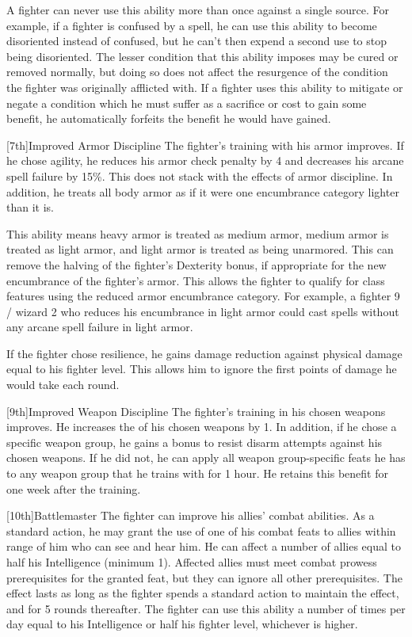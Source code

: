\par A fighter can never use this ability more than once against a single source.
For example, if a fighter is confused by a  spell, he can use this ability to become disoriented instead of confused, but he can't then expend a second use to stop being disoriented.
The lesser condition that this ability imposes may be cured or removed normally, but doing so does not affect the resurgence of the condition the fighter was originally afflicted with.
If a fighter uses this ability to mitigate or negate a condition which he must suffer as a sacrifice or cost to gain some benefit, he automatically forfeits the benefit he would have gained.

[7th]{Improved Armor Discipline}
The fighter's training with his armor improves.
If he chose agility, he reduces his armor check penalty by 4 and decreases his arcane spell failure by 15\%.
This does not stack with the effects of armor discipline.
In addition, he treats all body armor as if it were one encumbrance category lighter than it is.
\par This ability means heavy armor is treated as medium armor, medium armor is treated as light armor, and light armor is treated as being unarmored.
This can remove the halving of the fighter's Dexterity bonus, if appropriate for the new encumbrance of the fighter's armor.
This allows the fighter to qualify for class features using the reduced armor encumbrance category.
For example, a fighter 9 / wizard 2 who reduces his encumbrance in light armor could cast spells without any arcane spell failure in light armor.

If the fighter chose resilience, he gains damage reduction against physical damage equal to his fighter level. This allows him to ignore the first points of damage he would take each round.

[9th]{Improved Weapon Discipline}
The fighter's training in his chosen weapons improves.
He increases the  of his chosen weapons by 1.
In addition, if he chose a specific weapon group, he gains a  bonus to resist disarm attempts against his chosen weapons.
If he did not, he can apply all weapon group-specific feats he has to any weapon group that he trains with for 1 hour.
He retains this benefit for one week after the training.

[10th]{Battlemaster}
The fighter can improve his allies' combat abilities.
As a standard action, he may grant the use of one of his combat feats to allies within \rngmed range of him who can see and hear him.
He can affect a number of allies equal to half his Intelligence (minimum 1).
Affected allies must meet combat prowess prerequisites for the granted feat, but they can ignore all other prerequisites.
The effect lasts as long as the fighter spends a standard action to maintain the effect, and for 5 rounds thereafter.
The fighter can use this ability a number of times per day equal to his Intelligence or half his fighter level, whichever is higher.


